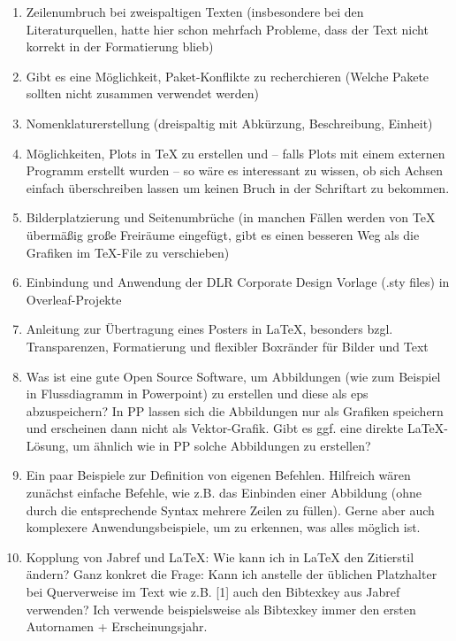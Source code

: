 \documentclass[ngerman]{beamer}
\renewcommand{\aa}{\textasteriskcentered}
\newcommand{\bb}{\textasteriskcentered\textasteriskcentered}
\newcommand{\cc}{\textasteriskcentered\textasteriskcentered\textasteriskcentered}
\begin{document}
\begin{frame}[allowframebreaks]

\begin{enumerate}
\item 
Zeilenumbruch bei zweispaltigen Texten (insbesondere bei den Literaturquellen,  hatte hier schon mehrfach Probleme,  dass der Text nicht korrekt in der Formatierung blieb) \aa %
\item Gibt es eine Möglichkeit, Paket-Konflikte zu recherchieren (Welche Pakete sollten nicht zusammen verwendet werden) \aa
\item Nomenklaturerstellung (dreispaltig mit Abkürzung, Beschreibung, Einheit) \aa
\item Möglichkeiten, Plots in TeX zu erstellen und -- falls Plots mit einem externen Programm erstellt wurden -- so wäre es interessant zu wissen, ob sich Achsen einfach überschreiben lassen um keinen Bruch in der Schriftart zu bekommen. \bb
\item Bilderplatzierung und Seitenumbrüche (in manchen Fällen werden von TeX übermäßig große Freiräume eingefügt, gibt es einen besseren Weg als die Grafiken im TeX-File zu verschieben) \aa

\item Einbindung und Anwendung der DLR Corporate Design Vorlage (.sty files) in Overleaf-Projekte \cc
\item Anleitung zur Übertragung eines Posters in LaTeX, besonders bzgl. Transparenzen, Formatierung und flexibler Boxränder für Bilder und Text \bb

\item Was ist eine gute Open Source Software, um Abbildungen (wie zum Beispiel in Flussdiagramm in Powerpoint) zu erstellen und diese als eps abzuspeichern? In PP lassen sich die Abbildungen nur als Grafiken speichern und erscheinen dann nicht als Vektor-Grafik. Gibt es ggf. eine direkte LaTeX-Lösung, um ähnlich wie in PP solche Abbildungen zu erstellen? \bb
 
\item Ein paar Beispiele zur Definition von eigenen Befehlen. Hilfreich wären zunächst einfache Befehle, wie z.B. das Einbinden einer Abbildung (ohne durch die entsprechende Syntax mehrere Zeilen zu füllen). Gerne aber auch komplexere Anwendungsbeispiele, um zu erkennen, was alles möglich ist. \aa
 
\item  
Kopplung von Jabref und LaTeX: Wie kann ich in LaTeX den Zitierstil ändern? Ganz konkret die Frage: Kann ich anstelle der üblichen Platzhalter bei Querverweise im Text wie z.B. [1] auch den Bibtexkey aus Jabref verwenden? Ich verwende beispielsweise als Bibtexkey immer den ersten Autornamen + Erscheinungsjahr. \aa
 

\end{enumerate}
\end{frame}
\end{document}
